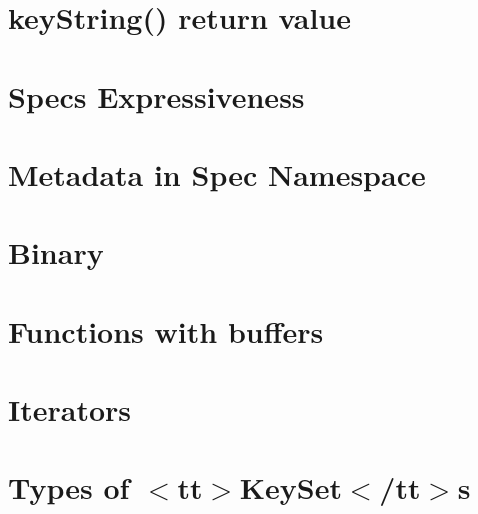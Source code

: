 \let\mypdfximage\pdfximage\def\pdfximage{\immediate\mypdfximage}\documentclass[twoside]{book}
\newcommand{\+}{\discretionary{\mbox{\scriptsize$\hookleftarrow$}}{}{}}
\begin{document}
\chapter{key\+String() return value}
\label{doc_decisions_1_problem_clear_key_string_return_value_md}

\chapter{Spec\textquotesingle{}s Expressiveness}
\label{doc_decisions_1_problem_clear_spec_expressiveness_md}

\chapter{Metadata in Spec Namespace}
\label{doc_decisions_1_problem_clear_spec_metadata_md}

\chapter{Binary}
\label{doc_decisions_2_solutions_clear_binary_md}

\chapter{Functions with buffers}
\label{doc_decisions_2_solutions_clear_functions_with_buffers_md}

\chapter{Iterators}
\label{doc_decisions_2_solutions_clear_iterators_md}

\chapter{Types of $<$tt$>$Key\+Set$<$/tt$>$s}
\label{doc_decisions_2_solutions_clear_keyset_types_md}

\end{document}
